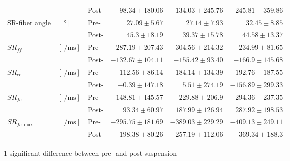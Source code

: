 \begin{landscape}
\begin{table}[!h]
\begin{center}
\begin{threeparttable}
\begin{tabular}{@{}lllrrr@{}}
                                                 &  														 			& Post- & $98.34   \pm 180.06$ & $134.03  \pm 245.76$  & $245.81 \pm 359.86$  \\ [6pt]
\multirow{2}{*}{SR-fiber angle\tnote{1}}         & \multirow{2}{*}{$\left[\SI{}{\degree}\right]$}	 			 	& Pre-  & $27.09   \pm 5.67$   & $27.14   \pm 7.93$    & $32.45 \pm 8.85$     \\
                                                 & 														 			& Post- & $45.3    \pm 18.19$  & $39.37   \pm 15.78$   & $44.58 \pm 13.37$    \\ [6pt]
\multirow{2}{*}{$SR_{ff}$}                       & \multirow{2}{*}{$\left[ \SI{}{\per\milli\second}\right]$}	 		& Pre-  & $-287.19 \pm 207.43$ & $-304.56 \pm 214.32$  & $-234.99 \pm 81.65$  \\
                                                 &  													     			& Post- & $-132.67 \pm 104.11$ & $-155.42 \pm 93.40$   & $-166.9 \pm 145.68$  \\ [6pt]
\multirow{2}{*}{$SR_{cc}$}                       & \multirow{2}{*}{$\left[ \SI{}{\per\milli\second}\right]$} 		& Pre-  & $112.56  \pm 86.14$  & $184.14  \pm 134.39$  & $192.76 \pm 187.55$  \\
                                                 &  														 			& Post- & $-0.39   \pm 147.18$ & $5.51    \pm 274.19$  & $-156.89 \pm 299.33$ \\ [6pt]
\multirow{2}{*}{$SR_{fc}$\tnote{2,5}}            & \multirow{2}{*}{$\left[ \SI{}{\per\milli\second}\right]$} 		& Pre-  & $148.81  \pm 145.57$ & $229.88  \pm 206.9$   & $294.36 \pm 237.35$  \\
                                                 &  														 			& Post- & $93.34   \pm 60.97$  & $187.99  \pm 126.94$  & $287.92 \pm 198.53$  \\ [6pt]
\multirow{2}{*}{$SR_{fc\_\,\mathrm{max}}$\tnote{2,5}}   & \multirow{2}{*}{$\left[ \SI{}{\per\milli\second}\right]$} & Pre-  & $-295.75  \pm 181.69$ & $-389.03  \pm 229.29$  & $-409.13 \pm 249.11$  \\
                                                 &  														 			& Post- & $-198.38  \pm 80.26$  & $-257.19  \pm 112.06$  & $-369.34 \pm 188.3$   \\ \midrule[0.3pt]\bottomrule[1pt]
\end{tabular}
\begin{tablenotes}[flushleft]\footnotesize
\item[1] significant difference between pre- and post-suspension

\end{tablenotes}
\end{threeparttable}
\end{center}
\end{table}
\end{landscape}
